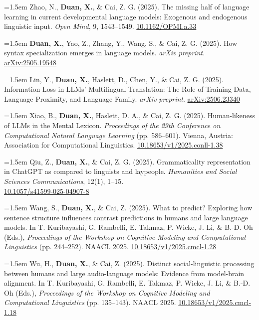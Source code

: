 \documentclass[11pt,a4paper]{article}
\begin{document}
\hangindent=1.5em  Zhao, N., \textbf{Duan, X.}, \& Cai, Z. G. (2025). The missing half of language learning in current developmental language models: Exogenous and endogenous linguistic input. \textit{Open Mind}, 9, 1543--1549. \href{https://doi.org/10.1162/OPMI.a.33}{10.1162/OPMI.a.33}

\hangindent=1.5em  \textbf{Duan, X.}, Yao, Z., Zhang, Y., Wang, S., \& Cai, Z. G. (2025). How syntax specialization emerges in language models. \textit{arXiv preprint}. \href{https://arxiv.org/abs/2505.19548}{arXiv:2505.19548}

\hangindent=1.5em  Lin, Y., \textbf{Duan, X.}, Haslett, D., Chen, Y., \& Cai, Z. G. (2025). Information Loss in LLMs' Multilingual Translation: The Role of Training Data, Language Proximity, and Language Family. \textit{arXiv preprint}. \href{https://arxiv.org/abs/2506.23340}{arXiv:2506.23340}

\hangindent=1.5em  Xiao, B., \textbf{Duan, X.}, Haslett, D. A., \& Cai, Z. G. (2025). Human-likeness of LLMs in the Mental Lexicon. \textit{Proceedings of the 29th Conference on Computational Natural Language Learning} (pp. 586–601). Vienna, Austria: Association for Computational Linguistics. \href{https://doi.org/10.18653/v1/2025.conll-1.38}{10.18653/v1/2025.conll-1.38}

\hangindent=1.5em  Qiu, Z., \textbf{Duan, X.}, \& Cai, Z. G. (2025). Grammaticality representation in ChatGPT as compared to linguists and laypeople. \textit{Humanities and Social Sciences Communications}, 12(1), 1–15. \\
\href{https://doi.org/10.1057/s41599-025-04907-8}{10.1057/s41599-025-04907-8}

\hangindent=1.5em  Wang, S., \textbf{Duan, X.}, \& Cai, Z. (2025). What to predict? Exploring how sentence structure influences contrast predictions in humans and large language models. In T. Kuribayashi, G. Rambelli, E. Takmaz, P. Wicke, J. Li, \& B.-D. Oh (Eds.), \textit{Proceedings of the Workshop on Cognitive Modeling and Computational Linguistics} (pp. 244–252). NAACL 2025. \href{https://doi.org/10.18653/v1/2025.cmcl-1.28}{10.18653/v1/2025.cmcl-1.28}

\hangindent=1.5em  Wu, H., \textbf{Duan, X.}, \& Cai, Z. (2025). Distinct social-linguistic processing between humans and large audio-language models: Evidence from model-brain alignment. In T. Kuribayashi, G. Rambelli, E. Takmaz, P. Wicke, J. Li, \& B.-D. Oh (Eds.), \textit{Proceedings of the Workshop on Cognitive Modeling and Computational Linguistics} (pp. 135–143). NAACL 2025. \href{https://doi.org/10.18653/v1/2025.cmcl-1.18}{10.18653/v1/2025.cmcl-1.18}
\end{document}
